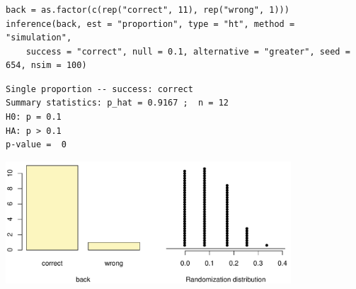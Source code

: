 \begin{frame}[fragile]
\frametitle{}

{\tiny
\begin{Verbatim}[frame=single, formatcom=\color{blue}]
back = as.factor(c(rep("correct", 11), rep("wrong", 1))) 
inference(back, est = "proportion", type = "ht", method = "simulation",
	success = "correct", null = 0.1, alternative = "greater", seed = 654, nsim = 100)
\end{Verbatim}
}

\pause

{\tiny
\begin{Verbatim}[frame=single, formatcom=\color{gray}]
Single proportion -- success: correct 
Summary statistics: p_hat = 0.9167 ;  n = 12 
H0: p = 0.1 
HA: p > 0.1 
p-value =  0 
\end{Verbatim}
}

\centering
\includegraphics[width=0.8\textwidth,height=0.4\textheight]{6-5_small_single_prop/figures/hand/back_HT}

\end{frame}

